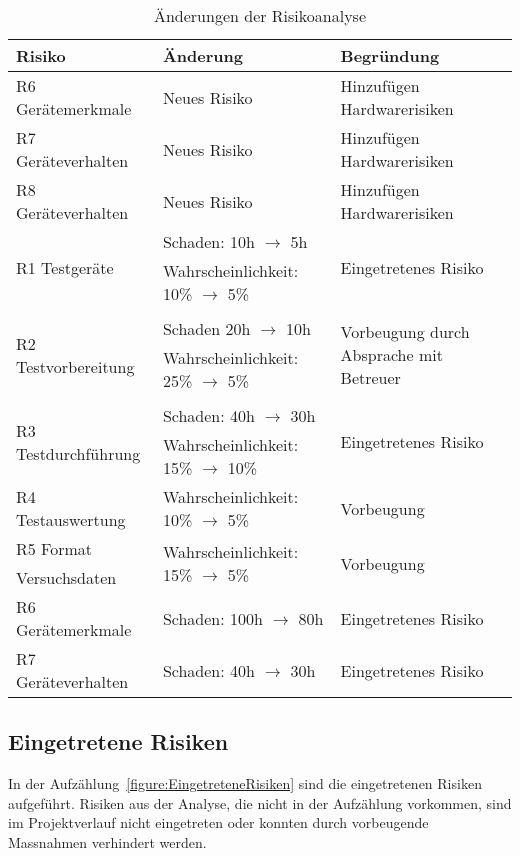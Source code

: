 \begin{table}[h!]
	\centering
	\begin{tabularx}{\linewidth}{l l X}
		\toprule 
		\textbf{Risiko} & \textbf{Änderung} & \textbf{Begründung} \\
		\midrule
		R6 Gerätemerkmale & Neues Risiko & Hinzufügen Hardwarerisiken \\
		\midrule
		R7 Geräteverhalten & Neues Risiko & Hinzufügen Hardwarerisiken \\
		\midrule 
		R8 Geräteverhalten & Neues Risiko & Hinzufügen Hardwarerisiken \\ 
		\midrule
		\multirow{2}{*}{R1 Testgeräte} & Schaden: 10h $\rightarrow$ 5h & \multirow{2}{=}{Eingetretenes Risiko} \\
		& Wahrscheinlichkeit: 10\% $\rightarrow$ 5\% & \\
		\midrule
		\multirow{4}{*}{R2 Testvorbereitung} &  &  \multirow{4}{=}{Vorbeugung durch Absprache mit Betreuer} \\
		& Schaden 20h $\rightarrow$ 10h & \\
		& Wahrscheinlichkeit: 25\% $\rightarrow$ 5\% & \\
		& & \\
		\midrule 
		\multirow{2}{*}{R3 Testdurchführung} & Schaden: 40h $\rightarrow$ 30h & \multirow{2}{=}{Eingetretenes Risiko} \\
		& Wahrscheinlichkeit: 15\% $\rightarrow$ 10\% & \\
		\midrule
		R4 Testauswertung & Wahrscheinlichkeit: 10\% $\rightarrow$ 5\% & Vorbeugung \\
		\midrule 
		R5 Format  & \multirow{2}{*}{Wahrscheinlichkeit: 15\% $\rightarrow$ 5\%} & \multirow{2}{*}{Vorbeugung} \\
		Versuchsdaten& & \\
		\midrule  
		R6 Gerätemerkmale & Schaden: 100h $\rightarrow$ 80h & Eingetretenes Risiko \\
		\midrule 
		R7 Geräteverhalten & Schaden: 40h $\rightarrow$ 30h & Eingetretenes Risiko \\
		\bottomrule 
	\end{tabularx} 
	\caption{Änderungen der Risikoanalyse
	\label{table:AenderungRisikoAnalyse}} 
\end{table}

\clearpage 

\subsection*{Eingetretene Risiken}
In der Aufzählung~\ref{figure:EingetreteneRisiken} sind die eingetretenen 
Risiken aufgeführt. 
Risiken aus der Analyse, die nicht in der Aufzählung vorkommen, 
sind im Projektverlauf nicht eingetreten oder konnten durch vorbeugende 
Massnahmen verhindert werden.

